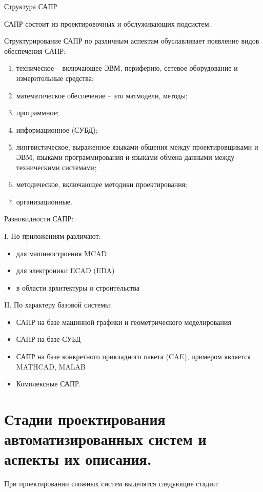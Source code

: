 \documentclass[unicode, 12pt, a4paper, oneside]{article}
\begin{document}
\underline{Структура САПР}

САПР состоит из проектировочных и обслуживающих подсистем.

Структурирование САПР по различным аспектам обуславливает появление видов обеспечения САПР:
\begin{enumerate}
\item техническое – включающее ЭВМ, периферию, сетевое оборудование и измерительные средства;
\item математическое обеспечение – это матмодели, методы;
\item программное;
\item информационное (СУБД);
\item лингвистическое, выраженное языками общения между проектировщиками и ЭВМ, языками программирования и языками обмена данными между техническими системами;
\item методическое, включающее методики проектирования;
\item организационные.
\end{enumerate}

Разновидности САПР:

I. По приложениям различают:
\begin{itemize}
\item для машиностроения MCAD
\item для электроники ECAD (EDA)
\item в области архитектуры и строительства
\end{itemize}

II. По характеру базовой системы:
\begin{itemize}
\item САПР на базе машинной графики и геометрического моделирования
\item САПР на базе СУБД
\item САПР на базе конкретного прикладного пакета (CAE), примером является MATHCAD, MALAB
\item Комплексные САПР.
\end{itemize}

\section{Стадии проектирования автоматизированных систем и аспекты их описания.}

При проектировании сложных систем выделятся следующие стадии:
\end{document}
